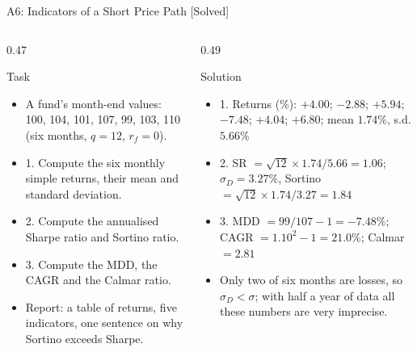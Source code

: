 \begin{frame}{A6: Indicators of a Short Price Path [Solved]}
\itemsize{\footnotesize}
\begin{columns}[T]
\begin{column}{0.47\textwidth}
\begin{block}{Task}
\begin{itemize}
    \item A fund's month-end values: 100, 104, 101, 107, 99, 103, 110 (six months, $q = 12$, $r_f = 0$).
    \item 1. Compute the six monthly simple returns, their mean and standard deviation.
    \item 2. Compute the annualised Sharpe ratio and Sortino ratio.
    \item 3. Compute the MDD, the CAGR and the Calmar ratio.
    \item Report: a table of returns, five indicators, one sentence on why Sortino exceeds Sharpe.
\end{itemize}
\end{block}
\end{column}
\begin{column}{0.49\textwidth}
\begin{exampleblock}{Solution}
\begin{itemize}
    \item 1. Returns (\%): $+4.00$; $-2.88$; $+5.94$; $-7.48$; $+4.04$; $+6.80$; mean $1.74\%$, s.d. $5.66\%$
    \item 2. SR $= \sqrt{12} \times 1.74/5.66 = 1.06$; $\sigma_D = 3.27\%$, Sortino $= \sqrt{12} \times 1.74/3.27 = 1.84$
    \item 3. MDD $= 99/107 - 1 = -7.48\%$; CAGR $= 1.10^{2} - 1 = 21.0\%$; Calmar $= 2.81$
    \item Only two of six months are losses, so $\sigma_D < \sigma$; with half a year of data all these numbers are very imprecise.
\end{itemize}
\end{exampleblock}
\end{column}
\end{columns}
\end{frame}

